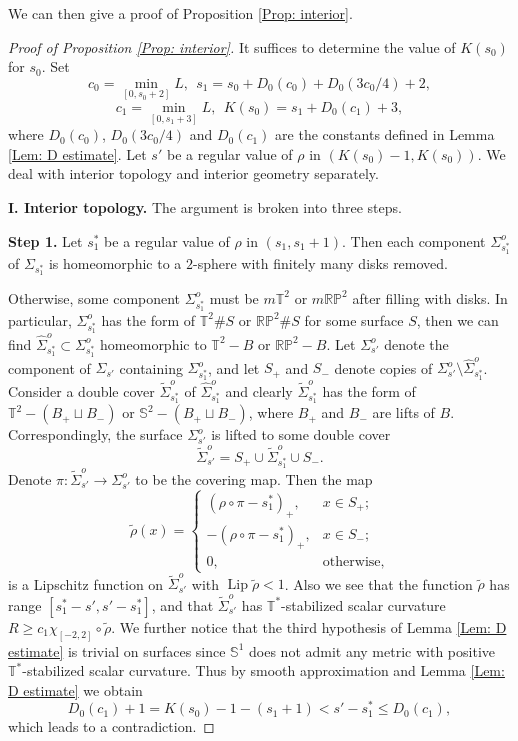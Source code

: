 \documentclass[11pt, reqno]{amsart}
\numberwithin{equation}{section}
\theoremstyle{definition}
\DeclareMathOperator{\Lip}{Lip}
\begin{document}
We can then give a proof of Proposition \ref{Prop: interior}.

\begin{proof}[Proof of Proposition \ref{Prop: interior}]
It suffices to determine the value of $K(s_{0})$ for $s_{0}$. Set
\[
c_{0} = \min_{[0,s_{0}+2]}L,\ \
s_{1} = s_{0}+D_{0}(c_{0})+D_{0}(3c_{0}/4)+2,
\]
\[
c_1=\min_{[0,s_{1}+3]}L,\ \ K(s_{0})=s_1+D_0(c_1)+3,
\]
where $D_0(c_0)$, $D_0(3c_0/4)$ and $D_0(c_1)$ are the constants defined in Lemma \ref{Lem: D estimate}.
Let $s'$ be a regular value of $\rho$ in $(K(s_0)-1,K(s_0))$.
We deal with interior topology and interior geometry separately.


\bigskip

\noindent
{\bf I. Interior topology.}
The argument is broken into three steps.

\medskip

\noindent
{\bf Step 1.} Let $s_{1}^{*}$ be a regular value of $\rho$ in $(s_{1},s_{1}+1)$. Then each component $\Sigma_{s_1^*}^o$ of $\Sigma_{s_1^*}$ is homeomorphic to a $2$-sphere with finitely many disks removed.

\medskip

Otherwise, some component $\Sigma_{s_1^*}^o$ must be $m\mathbb{T}^{2}$ or $m\mathbb{RP}^{2}$ after filling with disks. In particular, $\Sigma_{s_1^*}^o$ has the form of $\mathbb{T}^2\#S$ or $\mathbb{RP}^2\#S$ for some surface $S$, then we can find $\hat \Sigma^o_{s_1^*}\subset \Sigma_{s_1^*}^o$ homeomorphic to $\mathbb T^2-B$ or $\mathbb{RP}^{2}-B$.
Let $\Sigma_{s'}^o$ denote the component of $\Sigma_{s'}$ containing $\Sigma_{s_1^*}^o$, and let $S_+$ and $S_-$ denote copies of $\Sigma_{s'}^o\setminus \hat\Sigma_{s_1^*}^o$. Consider a double cover $\tilde\Sigma_{s_1^*}^o$ of $\hat\Sigma_{s_1^*}^o$ and clearly $\tilde\Sigma_{s_1^*}^o$ has the form of $\mathbb T^2-(B_+\sqcup B_-)$ or $\mathbb S^2-(B_+\sqcup B_-)$, where $B_+$ and $B_-$ are lifts of $B$. Correspondingly, the surface $\Sigma_{s'}^o$ is lifted to some double cover
\[
\tilde\Sigma_{s'}^o=S_+\cup \tilde\Sigma_{s_1^*}^o \cup S_-.
\]
Denote $\pi:\tilde\Sigma_{s'}^o\to \Sigma_{s'}^o$ to be the covering map. Then the map
\begin{equation*}
\tilde \rho(x)=\left\{
\begin{array}{cc}
(\rho\circ \pi-s_1^*)_+,& x\in S_+;\\[1mm]
-(\rho\circ \pi-s_1^*)_+,& x\in S_-;\\[1mm]
0,&\mbox{otherwise},
\end{array}\right.
\end{equation*}
is a Lipschitz function on $\tilde\Sigma_{s'}^o$ with $\Lip \tilde \rho<1$. Also we see that the function $\tilde \rho $ has range $[s_1^*-s',s'-s_1^*]$, and that $\tilde \Sigma_{s'}^o$ has $\mathbb{T}^*$-stabilized scalar curvature $R\geq c_1\chi_{[-2,2]}\circ\tilde \rho$. We further notice that the third hypothesis of Lemma \ref{Lem: D estimate} is trivial on surfaces since $\mathbb{S}^1$ does not admit any metric with positive $\mathbb{T}^{*}$-stabilized scalar curvature. Thus by smooth approximation and Lemma \ref{Lem: D estimate} we obtain
$$
D_0(c_1)+1 = K(s_{0})-1-(s_{1}+1) < s'-s_1^*\leq D_0(c_1),
$$
which leads to a contradiction.



\end{proof}
\end{document}

